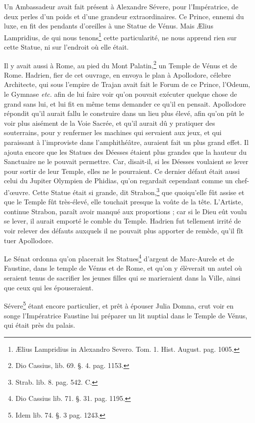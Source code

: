 \documentclass[a4paper, 11pt, oneside, polutonikogreek, french]{article}
\begin{document}
Un Ambassadeur avait fait présent à Alexandre Sévere, pour l'Impératrice, de deux perles d'un poids et d'une grandeur extraordinaires. Ce Prince, ennemi du luxe, en fit des pendants d'oreilles à une Statue de Vénus. Mais Ælius Lampridius, de qui nous tenons\footnote{Ælius Lampridius in Alexandro Severo. Tom. 1. Hist. August. pag. 1005.} cette particularité, ne nous apprend rien sur cette Statue, ni sur l'endroit où elle était.

Il y avait aussi à Rome, au pied du Mont Palatin,\footnote{Dio Cassius, lib. 69. §. 4. pag. 1153.} un Temple de Vénus et de Rome. Hadrien, fier de cet ouvrage, en envoya le plan à Apollodore, célebre Architecte, qui sous l'empire de Trajan avait fait le Forum de ce Prince, l'Odeum, le Gymnase \emph{etc.} afin de lui faire voir qu'on pouvait exécuter quelque chose de grand sans lui, et lui fit en même tems demander ce qu'il en pensait. Apollodore répondit qu'il aurait fallu le construire dans un lieu plus élevé, afin qu'on pût le voir plus aisément de la Voie Sacrée, et qu'il aurait dû y pratiquer des souterrains, pour y renfermer les machines qui servaient aux jeux, et qui paraissant à l'improviste dans l'amphithéâtre, auraient fait un plus grand effet. Il ajouta encore que les Statues des Déesses étaient plus grandes que la hauteur du Sanctuaire ne le pouvait permettre. Car, disait-il, si les Déesses voulaient se lever pour sortir de leur Temple, elles ne le pourraient. Ce dernier défaut était aussi celui du Jupiter Olympien de Phidias, qu'on regardait cependant comme un chef-d'œuvre. Cette Statue était si grande, dit Strabon,\footnote{Strab. lib. 8. pag. 542. C.} que quoiqu'elle fût assise et que le Temple fût très-élevé, elle touchait presque la voûte de la tête. L'Artiste, continue Strabon, paraît avoir manqué aux proportions ; car si le Dieu eût voulu se lever, il aurait emporté le comble du Temple. Hadrien fut tellement irrité de voir relever des défauts auxquels il ne pouvait plus apporter de remède, qu'il fît tuer Apollodore.

Le Sénat ordonna qu'on placerait les Statues\footnote{Dio Cassius lib. 71. §. 31. pag. 1195.} d'argent de Marc-Aurele et de Faustine, dans le temple de Vénus et de Rome, et qu'on y élèverait un autel où seraient tenus de sacrifier les jeunes filles qui se marieraient dans la Ville, ainsi que ceux qui les épouseraient.

Sévere\footnote{Idem lib. 74. §. 3 pag. 1243.} étant encore particulier, et prêt à épouser Julia Domna, crut voir en songe l'Impératrice Faustine lui préparer un lit nuptial dans le Temple de Vénus, qui était près du palais.
\end{document}
